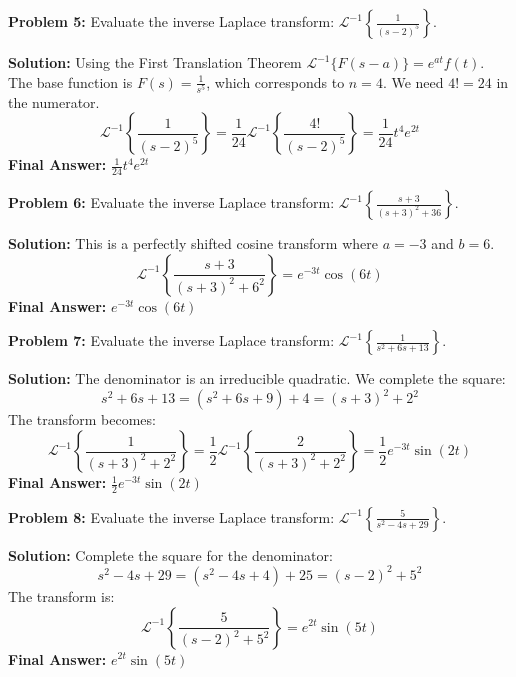 \documentclass[11pt, letterpaper]{article}
\theoremstyle{definition}
\theoremstyle{remark}
\begin{document}
\vspace{1em}

\textbf{Problem 5:} Evaluate the inverse Laplace transform: $\displaystyle \mathcal{L}^{-1} \left\{ \frac{1}{(s-2)^5} \right\}$.

\textbf{Solution:}
Using the First Translation Theorem $\mathcal{L}^{-1}\{F(s-a)\} = e^{at}f(t)$. The base function is $F(s) = \frac{1}{s^5}$, which corresponds to $n=4$. We need $4! = 24$ in the numerator.
\[
\mathcal{L}^{-1} \left\{ \frac{1}{(s-2)^5} \right\} = \frac{1}{24} \mathcal{L}^{-1} \left\{ \frac{4!}{(s-2)^5} \right\} = \frac{1}{24} t^4 e^{2t}
\]
\textbf{Final Answer:} $\displaystyle \frac{1}{24} t^4 e^{2t}$

\vspace{1em}

\textbf{Problem 6:} Evaluate the inverse Laplace transform: $\displaystyle \mathcal{L}^{-1} \left\{ \frac{s+3}{(s+3)^2 + 36} \right\}$.

\textbf{Solution:}
This is a perfectly shifted cosine transform where $a = -3$ and $b = 6$.
\[
\mathcal{L}^{-1} \left\{ \frac{s+3}{(s+3)^2 + 6^2} \right\} = e^{-3t} \cos(6t)
\]
\textbf{Final Answer:} $\displaystyle e^{-3t} \cos(6t)$

\vspace{1em}

\textbf{Problem 7:} Evaluate the inverse Laplace transform: $\displaystyle \mathcal{L}^{-1} \left\{ \frac{1}{s^2 + 6s + 13} \right\}$.

\textbf{Solution:}
The denominator is an irreducible quadratic. We complete the square:
\[
s^2 + 6s + 13 = (s^2 + 6s + 9) + 4 = (s+3)^2 + 2^2
\]
The transform becomes:
\[
\mathcal{L}^{-1} \left\{ \frac{1}{(s+3)^2 + 2^2} \right\} = \frac{1}{2} \mathcal{L}^{-1} \left\{ \frac{2}{(s+3)^2 + 2^2} \right\} = \frac{1}{2} e^{-3t} \sin(2t)
\]
\textbf{Final Answer:} $\displaystyle \frac{1}{2} e^{-3t} \sin(2t)$

\vspace{1em}

\textbf{Problem 8:} Evaluate the inverse Laplace transform: $\displaystyle \mathcal{L}^{-1} \left\{ \frac{5}{s^2 - 4s + 29} \right\}$.

\textbf{Solution:}
Complete the square for the denominator:
\[
s^2 - 4s + 29 = (s^2 - 4s + 4) + 25 = (s-2)^2 + 5^2
\]
The transform is:
\[
\mathcal{L}^{-1} \left\{ \frac{5}{(s-2)^2 + 5^2} \right\} = e^{2t} \sin(5t)
\]
\textbf{Final Answer:} $\displaystyle e^{2t} \sin(5t)$

\vspace{1em}
\end{document}
